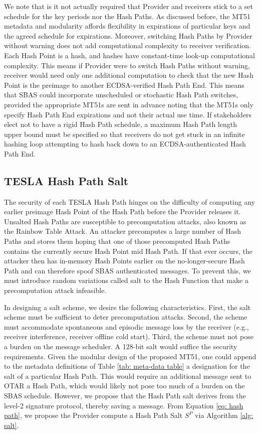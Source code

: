 \documentclass[letterpaper,times]{IONconf/IONconf}
\begin{document}
We note that is it not actually required that Provider and receivers stick to a set schedule for the key periods nor the Hash Paths.
As discussed before, the MT51 metadata and modularity affords flexibility in expirations of particular keys and the agreed schedule for expirations.
Moreover, switching Hash Paths by Provider without warning does not add computational complexity to receiver verification.
Each Hash Point is a hash, and hashes have constant-time look-up computational complexity.
This means if Provider were to switch Hash Paths without warning, receiver would need only one additional computation to check that the new Hash Point is the preimage to another ECDSA-verified Hash Path End.
This means that SBAS could incorporate unscheduled or stochastic Hash Path switches, provided the appropriate MT51s are sent in advance noting that the MT51s only specify Hash Path End expirations and not their actual use time.
If stakeholders elect not to have a rigid Hash Path schedule, a maximum Hash Path length upper bound must be specified so that receivers do not get stuck in an infinite hashing loop attempting to hash back down to an ECDSA-authenticated Hash Path End.

\subsection{TESLA Hash Path Salt} \label{sec: salt}

The security of each TESLA Hash Path hinges on the difficulty of computing any earlier preimage Hash Point of the Hash Path before the Provider releases it.
Unsalted Hash Paths are susceptible to precomputation attacks, also known as the Rainbow Table Attack.
An attacker precomputes a large number of Hash Paths and stores them hoping that one of those precomputed Hash Paths contains the currently secure Hash Point mid Hash Path.
If that ever occurs, the attacker then has in-memory Hash Points earlier on the no-longer-secure Hash Path and can therefore spoof SBAS authenticated messages.
To prevent this, we must introduce random variations called salt to the Hash Function that make a precomputation attack infeasible.

In designing a salt scheme, we desire the following characteristics.
First, the salt scheme must be sufficient to deter precomputation attacks.
Second, the scheme must accommodate spontaneous and episodic message loss by the receiver (e.g., receiver interference, receiver offline cold start).
Third, the scheme must not pose a burden on the message scheduler.
A 128-bit salt would suffice the security requirements.
Given the modular design of the proposed MT51, one could append to the metadata definitions of Table \ref{tab: meta-data table} a designation for the salt of a particular Hash Path.
This would require an additional message sent to OTAR a Hash Path, which would likely not pose too much of a burden on the SBAS schedule.
However, we propose that the Hash Path salt derives from the level-2 signature protocol, thereby saving a message.
From Equation \eqref{eq: hash path}, we propose the Provider compute a Hash Path Salt $S^P$ via Algorithm \ref{alg: salt}.
\end{document}
